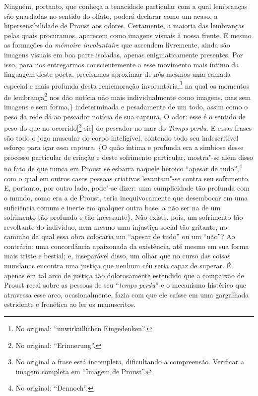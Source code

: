 Ninguém, portanto, que conheça a tenacidade particular com a qual lembranças são
guardadas no sentido do olfato, poderá declarar como um acaso, a
hipersensibilidade de Proust aos odores. Certamente, a maioria das
lembranças pelas quais procuramos, aparecem como imagens visuais à nossa
frente. E mesmo as formações da \emph{mémoire involuntaire} que ascendem
livremente, ainda são imagens visuais em boa parte isoladas, apenas
enigmaticamente presentes. Por isso, para nos entregarmos
conscientemente a esse movimento mais íntimo da linguagem deste poeta,
precisamos aproximar de nós mesmos uma camada especial e mais profunda
desta rememoração involuntária,\footnote{No original:
``unwirküllichen Eingedenken''. \versal{[N. T.]}} na qual os momentos de
lembrança\footnote{No original: ``Erinnerung''. \versal{[N. T.]}} nos dão notícia
não mais individualmente como imagens, mas sem imagens e sem forma,\}
indeterminada e pesadamente de um todo, assim como o peso da rede dá ao
pescador notícia de sua captura. O odor: esse é o sentido de peso do que
no ocorrido{[}\footnote{No original a frase está incompleta,
  dificultando a compreensão. Verificar a imagem completa em ``Imagem de Proust''. \versal{[N. T.]}} sic{]} do pescador no mar do \emph{Temps
perdu}. E essas frases são todo o jogo muscular do corpo inteligível,
contendo todo seu indescritível esforço para içar essa captura. \{O
quão íntima e profunda era a simbiose desse processo particular de
criação e deste sofrimento particular, mostra"-se além disso no fato
de que nunca em Proust se esbarra naquele heroico ``apesar de
tudo'',\footnote{No original: ``Dennoch''. \versal{[N. T.]}} com o qual em outros
casos pessoas criativas levantam"-se contra seu sofrimento. E, portanto, por outro lado,
pode"-se dizer: uma cumplicidade tão profunda com o mundo,
como era a de Proust, teria inequivocamente que desembocar em uma
suficiência comum e inerte em qualquer outra base, a não ser na de um
sofrimento tão profundo e tão incessante\}. Não existe, pois, um
sofrimento tão revoltante do indivíduo, nem mesmo uma injustiça social
tão gritante, no caminho da qual essa obra colocaria um ``apesar de
tudo'' ou um ``não''? Ao contrário: uma concordância apaixonada da
existência, até mesmo em sua forma mais triste e bestial; e, inseparável
disso, um olhar que no curso das coisas mundanas encontra uma justiça
que nenhum céu seria capaz de superar. É apenas em tal arco de justiça
tão dolorosamente estendido que a compaixão de Proust recai
sobre as pessoas de seu ``\emph{temps perdu}'' e o mecanismo histérico
que atravessa esse arco, ocasionalmente, fazia com que ele caísse em uma gargalhada estridente e frenética ao ler os manuscritos.

